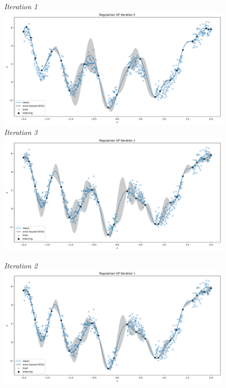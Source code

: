 \documentclass{article}
\numberwithin{equation}{section}
\begin{document}
\begin{figure}[h!]
\small
\centering
\begin{minipage}{.5\textwidth}
  \centering
  \textit{Iteration 1}
  \includegraphics[width=\linewidth, trim={0 0 0 0.77cm},clip]{thesis-report/figures/inducing_points_kernel/iteration-0/prediction.png} 
  \textit{Iteration 3}
  \includegraphics[width=\linewidth, trim={0 0 0 0.77cm},clip]{thesis-report/figures/inducing_points_kernel/iteration-2/prediction.png}
\end{minipage}%
\begin{minipage}{.5\textwidth}
  \centering
  \textit{Iteration 2}
  \includegraphics[width=\linewidth, trim={0 0 0 0.77cm},clip]{thesis-report/figures/inducing_points_kernel/iteration-1/prediction.png}

\end{minipage}
\end{figure}
\end{document}
